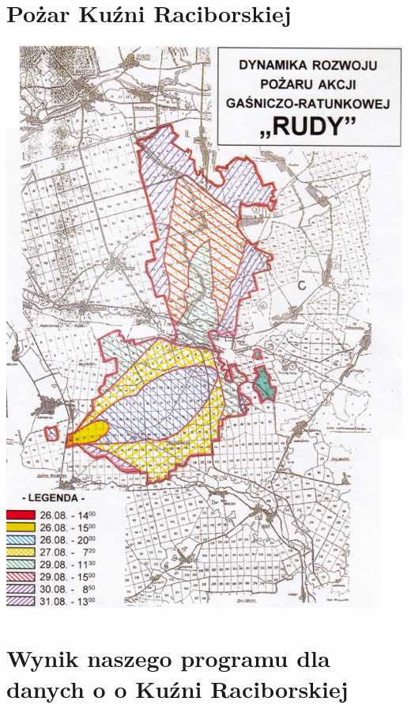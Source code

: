 \documentclass[a4paper, 11pt]{article}
\begin{document}
	\section*{Pożar Kuźni Raciborskiej}
	\includegraphics[scale=0.7]{kuzniaR.jpg}\\
	
	
	
	
	\section*{Wynik naszego programu dla danych o o Kuźni Raciborskiej}
	
\end{document}
